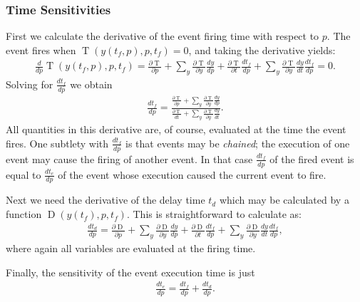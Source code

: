 \documentclass[12pt]{article}
\newcommand{\trigger}{\ensuremath{\operatorname{T}}\xspace}
\newcommand{\delay}{\ensuremath{\operatorname{D}}\xspace}
\begin{document}
\subsubsection{Time Sensitivities}
First we calculate the derivative of the event firing time with respect to $p$.
The event fires when $\trigger(y(t_f, p), p, t_f) = 0$, and taking the derivative yields:
\begin{align}
\frac{d}{dp}\trigger(y(t_f, p), p, t_f) =
   \frac{\partial \trigger}{\partial p} 
   + \sum_y \frac{\partial \trigger}{\partial y} \frac{dy}{dp} 
   + \frac{\partial \trigger}{\partial t} \frac{d t_f}{dp} 
   + \sum_y \frac{\partial \trigger}{\partial y} \frac{dy}{dt}\frac{d t_f}{dp}
= 0.
\end{align}
Solving for $\frac{d t_f}{dp}$ we obtain
\begin{align}
\frac{d t_f}{dp} = 
\frac{
    \frac{\partial \trigger}{\partial p} 
    + \sum_y \frac{\partial \trigger}{\partial y} \frac{dy}{dp}
}{
    \frac{\partial \trigger}{dt} 
    + \sum_y \frac{\partial \trigger}{\partial y} \frac{dy}{dt}
}.
\end{align}
All quantities in this derivative are, of course, evaluated at the time the
event fires.
One subtlety with $\frac{d t_f}{dp}$ is that events may be \emph{chained}; the execution of one event may cause the firing of another event.
In that case $\frac{d t_f}{dp}$ of the fired event is equal to $\frac{d t_e}{dp}$ of the event whose execution caused the current event to fire.

Next we need the derivative of the delay time $t_d$ which may be calculated by a function $\delay(y(t_f), p, t_f)$. This is straightforward to calculate as:
\begin{align}
\frac{d t_d}{dp} = 
\frac{\partial \delay}{\partial p} 
+ \sum_y \frac{\partial \delay}{\partial y} \frac{dy}{dp} 
+ \frac{\partial \delay}{\partial t} \frac{d t_f}{dp} 
+ \sum_y \frac{\partial \delay}{\partial y} \frac{dy}{dt}\frac{d t_f}{dp},
\end{align}
where again all variables are evaluated at the firing time.

Finally, the sensitivity of the event execution time is just
\begin{align}
\frac{d t_e}{dp} = \frac{d t_f}{dp} + \frac{d t_d}{dp}.
\end{align}
\end{document}
